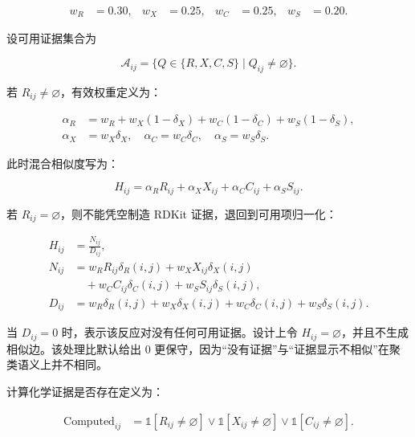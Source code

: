 \documentclass[11pt]{article}
\numberwithin{equation}{section}
\begin{document}
\begin{equation}
\begin{aligned}
w_R &= 0.30, &
w_X &= 0.25, &
w_C &= 0.25, &
w_S &= 0.20.
\end{aligned}
\end{equation}

设可用证据集合为

\begin{equation}
\mathcal A_{ij}
=
\{Q\in\{R,X,C,S\}\mid Q_{ij}\neq\varnothing\}.
\end{equation}

若 \(R_{ij}\neq\varnothing\)，有效权重定义为：

\begin{equation}
\begin{aligned}
\alpha_R
&=
w_R
+ w_X(1-\delta_X)
+ w_C(1-\delta_C)
+ w_S(1-\delta_S), \\
\alpha_X &= w_X\delta_X,\quad
\alpha_C = w_C\delta_C,\quad
\alpha_S = w_S\delta_S.
\end{aligned}
\end{equation}

此时混合相似度写为：

\begin{equation}
H_{ij}
=
\alpha_R R_{ij}
+ \alpha_X X_{ij}
+ \alpha_C C_{ij}
+ \alpha_S S_{ij}.
\end{equation}

若 \(R_{ij}=\varnothing\)，则不能凭空制造 RDKit 证据，退回到可用项归一化：

\begin{equation}
\begin{aligned}
H_{ij}
&=
\frac{N_{ij}}{D_{ij}}, \\
N_{ij}
&=
w_R R_{ij}\delta_R(i,j)
+ w_X X_{ij}\delta_X(i,j) \\
&\quad
+ w_C C_{ij}\delta_C(i,j)
+ w_S S_{ij}\delta_S(i,j), \\
D_{ij}
&=
w_R \delta_R(i,j)
+ w_X \delta_X(i,j)
+ w_C \delta_C(i,j)
+ w_S \delta_S(i,j).
\end{aligned}
\end{equation}

当 \(D_{ij}=0\) 时，表示该反应对没有任何可用证据。设计上令 \(H_{ij}=\varnothing\)，并且不生成相似边。该处理比默认给出 \(0\) 更保守，因为“没有证据”与“证据显示不相似”在聚类语义上并不相同。

计算化学证据是否存在定义为：

\begin{equation}
\begin{aligned}
\mathrm{Computed}_{ij}
&=
\mathbb 1[R_{ij}\neq\varnothing]
\lor
\mathbb 1[X_{ij}\neq\varnothing]
\lor
\mathbb 1[C_{ij}\neq\varnothing].
\end{aligned}
\end{equation}
\end{document}
